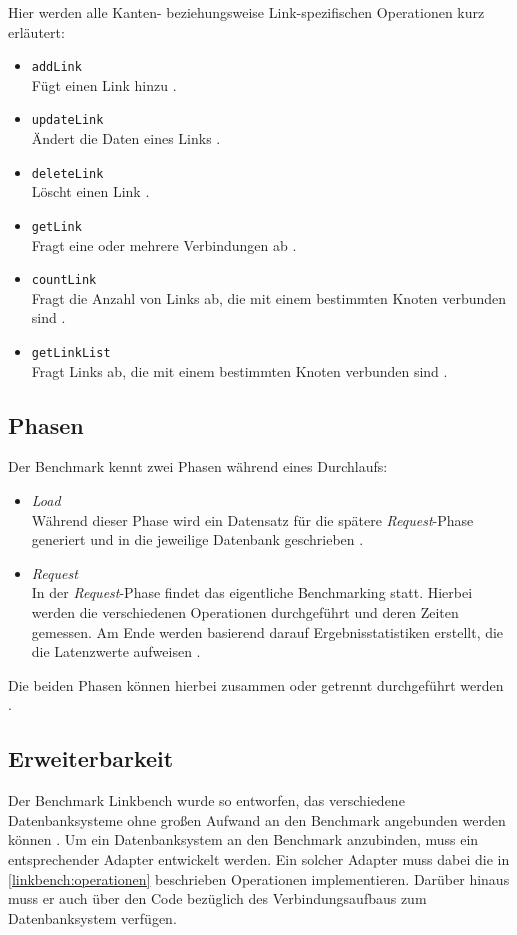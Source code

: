 Hier werden alle Kanten- beziehungsweise Link-spezifischen Operationen kurz erläutert:
\begin{itemize}
    \item \texttt{addLink}\\
    Fügt einen Link hinzu \cite{fb_linkbench_github}.
    \item \texttt{updateLink}\\
    Ändert die Daten eines Links  \cite{fb_linkbench_github}.
    \item \texttt{deleteLink}\\
    Löscht einen Link \cite{fb_linkbench_github}.
    \item \texttt{getLink}\\
    Fragt eine oder mehrere Verbindungen ab \cite{fb_linkbench_github}.
    \item \texttt{countLink}\\
    Fragt die Anzahl von Links ab, die mit einem bestimmten Knoten verbunden sind \cite{fb_linkbench_github}.
    \item \texttt{getLinkList}\\
    Fragt Links ab, die mit einem bestimmten Knoten verbunden sind \cite{fb_linkbench_github}.
\end{itemize}

\subsection{Phasen}
Der Benchmark kennt zwei Phasen während eines Durchlaufs: 
\begin{itemize}
    \item \textit{Load}\\
    Während dieser Phase wird ein Datensatz für die spätere \textit{Request}-Phase generiert und in die jeweilige Datenbank geschrieben \cite{fb_linkbench_github}.
    \item \textit{Request}\\
    In der \textit{Request}-Phase findet das eigentliche Benchmarking statt. Hierbei werden die verschiedenen Operationen durchgeführt und deren Zeiten gemessen. Am Ende werden basierend darauf Ergebnisstatistiken erstellt, die die Latenzwerte aufweisen \cite{fb_linkbench_github}. 
\end{itemize}
Die beiden Phasen können hierbei zusammen oder getrennt durchgeführt werden \cite{fb_linkbench_github}.

\subsection{Erweiterbarkeit}
Der Benchmark Linkbench wurde so entworfen, das verschiedene Datenbanksysteme ohne großen Aufwand an den Benchmark angebunden werden können \cite{linkbench_paper}. Um ein Datenbanksystem an den Benchmark anzubinden, muss ein entsprechender Adapter entwickelt werden. Ein solcher Adapter muss dabei die in \autoref{linkbench:operationen} beschrieben Operationen implementieren. Darüber hinaus muss er auch über den Code bezüglich des Verbindungsaufbaus zum Datenbanksystem verfügen. 

